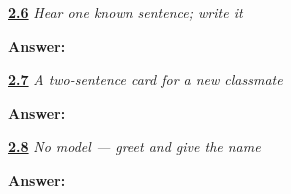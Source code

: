 \noindent\begin{minipage}[t]{\linewidth}
\raggedright
\hyperlink{review-HI-W06-name-sentence-dictation-check}{\textbf{2.6}} \emph{Hear one known sentence; write it}\par
\small \textbf{Answer:}    \par
\end{minipage}\par\medskip

\noindent\begin{minipage}[t]{\linewidth}
\raggedright
\hyperlink{review-HI-W06-two-sentence-card-check}{\textbf{2.7}} \emph{A two-sentence card for a new classmate}\par
\small \textbf{Answer:}     \par
\end{minipage}\par\medskip

\noindent\begin{minipage}[t]{\linewidth}
\raggedright
\hyperlink{review-HI-W06-two-sentence-no-model-check}{\textbf{2.8}} \emph{No model — greet and give the name}\par
\small \textbf{Answer:}     \par
\end{minipage}\par\medskip
